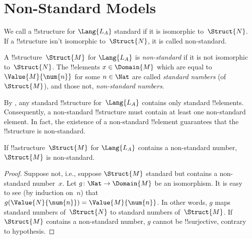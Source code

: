 \documentclass[../../../include/open-logic-section]{subfiles}
\begin{document}
\section{Non-Standard Models}

\begin{explain}
We call a !!{structure} for $\Lang{L_A}$ standard if it is isomorphic
to~$\Struct{N}$. If a !!{structure} isn't isomorphic to~$\Struct{N}$,
it is called non-standard.
\end{explain}

\begin{defn}
A !!{structure}~$\Struct{M}$ for $\Lang{L_A}$ is \emph{non-standard}
if it is not isomorphic to~$\Struct{N}$. The !!{element}s $x \in
\Domain{M}$ which are equal to $\Value{M}{\num{n}}$ for some $n \in
\Nat$ are called \emph{standard numbers} (of $\Struct{M}$), and those
not, \emph{non-standard numbers}.
\end{defn}

\begin{explain}
By , any standard !!{structure}
for~$\Lang{L_A}$ contains only standard !!{element}s. Consequently, a
non-standard !!{structure} must contain at least one non-standard
element. In fact, the existence of a non-standard !!{element}
guarantees that the !!{structure} is non-standard.
\end{explain}

\begin{prop}
If !!a{structure}~$\Struct{M}$ for $\Lang{L_A}$ contains a
non-standard number, $\Struct{M}$ is non-standard.
\end{prop}

\begin{proof}
Suppose not, i.e., suppose $\Struct{M}$ standard but contains a
non-standard number~$x$. Let $g\colon \Nat \to \Domain{M}$ be an
isomorphism. It is easy to see (by induction on~$n$) that
$g(\Value{N}{\num{n}}) = \Value{M}{\num{n}}$. In other words, $g$ maps
standard numbers of~$\Struct{N}$ to standard numbers
of~$\Struct{M}$. If $\Struct{M}$ contains a non-standard number, $g$
cannot be !!{surjective}, contrary to hypothesis.
\end{proof}
\end{document}
